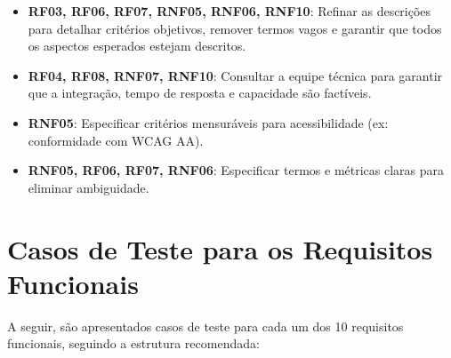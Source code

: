\begin{itemize}
    \item \textbf{RF03, RF06, RF07, RNF05, RNF06, RNF10}: Refinar as descrições para detalhar critérios objetivos, remover termos vagos e garantir que todos os aspectos esperados estejam descritos.
    \item \textbf{RF04, RF08, RNF07, RNF10}: Consultar a equipe técnica para garantir que a integração, tempo de resposta e capacidade são factíveis.
    \item \textbf{RNF05}: Especificar critérios mensuráveis para acessibilidade (ex: conformidade com WCAG AA).
    \item \textbf{RNF05, RF06, RF07, RNF06}: Especificar termos e métricas claras para eliminar ambiguidade.
\end{itemize}

\section{Casos de Teste para os Requisitos Funcionais}

A seguir, são apresentados casos de teste para cada um dos 10 requisitos funcionais, seguindo a estrutura recomendada:

